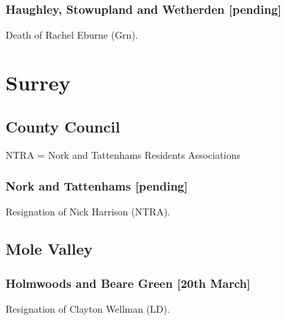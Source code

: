 \documentclass[a4paper,openany]{book}
\begin{document}
\begin{resultsiii}
\subsubsection*{Haughley, Stowupland and Wetherden \hspace*{\fill}\nolinebreak[1]%
	\enspace\hspace*{\fill}
	[pending]}


Death of Rachel Eburne (Grn).

\section{Surrey}

\subsection*{County Council}

NTRA = Nork and Tattenhams Residents Associations

\subsubsection*{Nork and Tattenhams \hspace*{\fill}\nolinebreak[1]%
	\enspace\hspace*{\fill}
	[pending]}


Resignation of Nick Harrison (NTRA).

\subsection*{Mole Valley}

\subsubsection*{Holmwoods and Beare Green \hspace*{\fill}\nolinebreak[1]%
	\enspace\hspace*{\fill}
	[20th March]}


Resignation of Clayton Wellman (LD).


\end{resultsiii}
\end{document}
